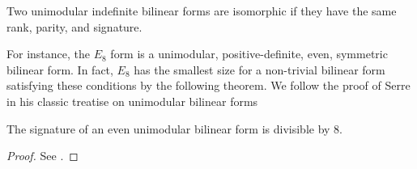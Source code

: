 
\begin{theorem}\label{thm:indefinite-bilinear-forms-isomorphic}
	Two unimodular indefinite bilinear forms are isomorphic if they have the same rank, parity, and signature.
\end{theorem}

For instance, the $E_8$ form is a unimodular, positive-definite, even, symmetric bilinear form. In fact, $E_8$ has the smallest size for a non-trivial bilinear form satisfying these conditions by the following theorem. We follow the proof of Serre in his classic treatise on unimodular bilinear forms 

\begin{theorem}
	The signature of an even unimodular bilinear form is divisible by $8$.
\end{theorem}
\begin{proof}
	See \cite{serre1961forms}.
\end{proof}

%
